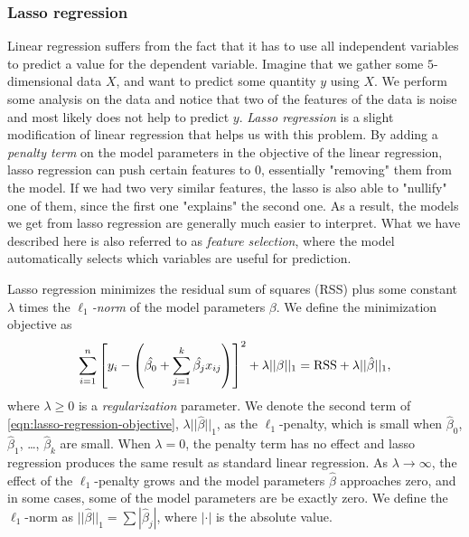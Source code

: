 \subsubsection{Lasso regression}
\label{sec:lasso-regression}
Linear regression suffers from the fact that it has to use all independent variables to predict a value for the dependent variable. Imagine that we gather some $5$-dimensional data $X$, and want to predict some quantity $y$ using $X$. We perform some analysis on the data and notice that two of the features of the data is noise and most likely does not help to predict $y$. \textit{Lasso regression} is a slight modification of linear regression that helps us with this problem. By adding a \textit{penalty term} on the model parameters in the objective of the linear regression, lasso regression can push certain features to 0, essentially "removing" them from the model. If we had two very similar features, the lasso is also able to "nullify" one of them, since the first one "explains" the second one. As a result, the models we get from lasso regression are generally much easier to interpret. What we have described here is also referred to as \textit{feature selection}, where the model automatically selects which variables are useful for prediction.

Lasso regression minimizes the residual sum of squares (RSS) plus some constant $\lambda$ times the \textit{$\ell_1$-norm} of the model parameters $\beta$. We define the minimization objective as
\begin{align}
    \sum\limits_{i=1}^{n}{\left[y_i - \left(\hat{\beta_0} +  \sum\limits_{j=1}^{k}{\hat{\beta_j}x_{ij}}\right)\right]^2} + \lambda ||\beta||_1 = \text{RSS} + \lambda ||\hat{\beta}||_1,
    \label{eqn:lasso-regression-objective}
\end{align}
where $\lambda \geq 0$ is a \textit{regularization} parameter. We denote the second term of \cref{eqn:lasso-regression-objective}, $\lambda ||\hat{\beta}||_1$, as the $\ell_1$-penalty, which is small when $\hat{\beta}_0$, $\hat{\beta}_1$, \ldots, $\hat{\beta}_k$ are small. When $\lambda = 0$, the penalty term has no effect and lasso regression produces the same result as standard linear regression. As $\lambda \rightarrow \infty$, the effect of the $\ell_1$-penalty grows and the model parameters $\hat{\beta}$ approaches zero, and in some cases, some of the model parameters are be exactly zero. We define the $\ell_1$-norm as $||\hat{\beta}||_1 = \sum |\hat{\beta}_j|$, where $|\cdot|$ is the absolute value.


